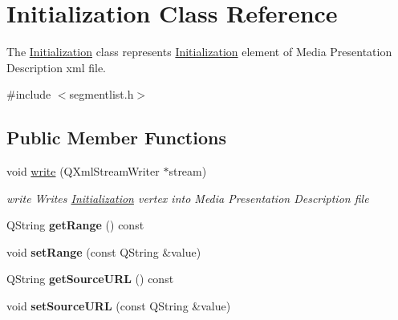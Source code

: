 \hypertarget{class_initialization}{\section{Initialization Class Reference}
\label{class_initialization}
}


The \hyperlink{class_initialization}{Initialization} class represents \hyperlink{class_initialization}{Initialization} element of Media Presentation Description xml file.  




{\ttfamily \#include $<$segmentlist.\-h$>$}

\subsection*{Public Member Functions}
\begin{DoxyCompactItemize}
\item 
void \hyperlink{class_initialization_adbcec26db9b9b33a9b370875e656a93c}{write} (Q\-Xml\-Stream\-Writer $\ast$stream)
\begin{DoxyCompactList}\small\item\em write Writes \hyperlink{class_initialization}{Initialization} vertex into Media Presentation Description file \end{DoxyCompactList}\item 
\hypertarget{class_initialization_acb7cef5e5fd3b5c8efa67ec28097469f}{Q\-String {\bfseries get\-Range} () const }\label{class_initialization_acb7cef5e5fd3b5c8efa67ec28097469f}

\item 
\hypertarget{class_initialization_a82064f6832cf34a835ffef527d445c29}{void {\bfseries set\-Range} (const Q\-String \&value)}\label{class_initialization_a82064f6832cf34a835ffef527d445c29}

\item 
\hypertarget{class_initialization_a00fa04548517a51d0313a05250a12dab}{Q\-String {\bfseries get\-Source\-U\-R\-L} () const }\label{class_initialization_a00fa04548517a51d0313a05250a12dab}

\item 
\hypertarget{class_initialization_a82a2cf2f57099460d76de18bf3b9b6fe}{void {\bfseries set\-Source\-U\-R\-L} (const Q\-String \&value)}\label{class_initialization_a82a2cf2f57099460d76de18bf3b9b6fe}

\end{DoxyCompactItemize}


